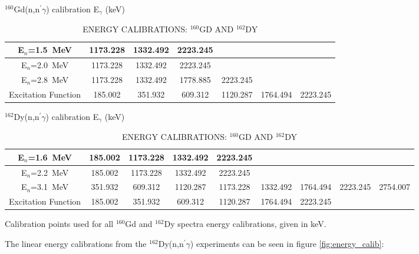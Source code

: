 \begin{landscape}
\begin{table}[ht]
\begin{center}
\caption{ENERGY CALIBRATIONS: $^{160}$GD AND $^{162}$DY \label{tab:calib_params}} 

$^{160}$Gd(n,n$^\prime\gamma$) calibration E$_\gamma$ (keV)\\
\begin{tabular}{c|c|c|c|c|c|c}
\hline
\hline
E$_n$=1.5~MeV & 1173.228 & 1332.492  & 2223.245  \\ 
\hline
E$_n$=2.0~MeV &  1173.228 & 1332.492  & 2223.245    \\ 
\hline
E$_n$=2.8~MeV  &  1173.228 & 1332.492  & 1778.885 & 2223.245    \\ 
\hline
Excitation Function & 185.002 & 351.932 & 609.312 & 1120.287 &  1764.494 & 2223.245  \\ 
\end{tabular}

\vspace{5mm}
$^{162}$Dy(n,n$^\prime\gamma$) calibration E$_\gamma$ (keV)\\
\begin{tabular}{c|c|c|c|c|c|c|c|c}
\hline
\hline
E$_n$=1.6~MeV & 185.002 &  1173.228 & 1332.492 &  2223.245  \\ 
\hline
E$_n$=2.2~MeV & 185.002 &   1173.228 & 1332.492 &   2223.245    \\ 
\hline
E$_n$=3.1~MeV  & 351.932 & 609.312 & 1120.287 & 1173.228 & 1332.492 & 1764.494 & 2223.245 & 2754.007  \\ 
\hline
Excitation Function & 185.002 & 351.932 & 609.312 & 1120.287 &   1764.494 & 2223.245  \\ 
\end{tabular}
\vspace{10pt}
\end{center}
Calibration points used for all $^{160}$Gd and $^{162}$Dy spectra energy calibrations, given in keV.
\end{table}
\end{landscape}

The linear energy calibrations from the $^{162}$Dy(n,n$^\prime\gamma$) experiments can be seen in figure \ref{fig:energy_calib}:

